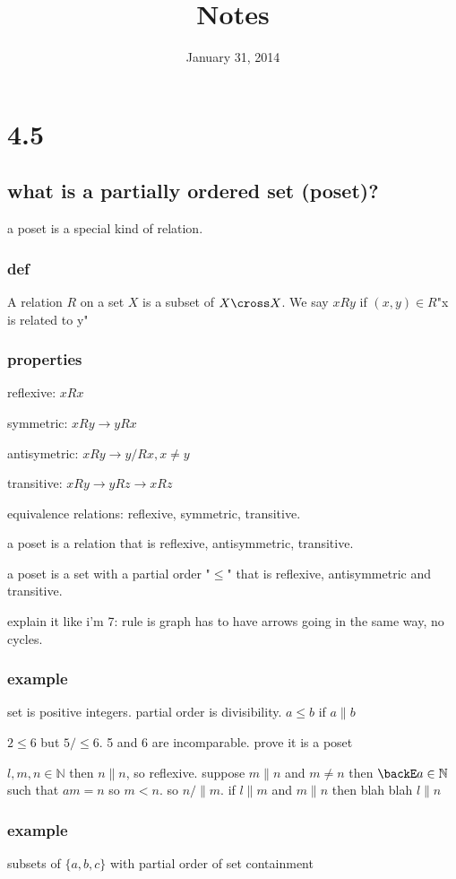 \documentclass{article}
\begin{document}
\title{Notes}
\date{January 31, 2014}
\maketitle
\section*{4.5}
\subsection*{what is a partially ordered set (poset)?}

a poset is a special kind of relation.
\subsubsection*{def}
A relation $R$ on a set $X$ is a subset of $X\cross X$. We say $xRy$ if $(x,y)\in R$"x is related to y"
\subsubsection*{properties}
reflexive: $xRx$

symmetric: $xRy\to yRx$

antisymetric: $xRy\to y\slash{R}x, x\neq y$

transitive: $xRy\to yRz\to xRz$

equivalence relations: reflexive, symmetric, transitive.

a poset is a relation that is reflexive, antisymmetric, transitive.

a poset is a set with a partial order "$\leq$" that is reflexive, antisymmetric and transitive.

explain it like i'm 7: rule is graph has to have arrows going in the same way, no cycles.

\subsubsection*{example}
set is positive integers. partial order is divisibility.
$a\leq b$ if $a\|b$

$2\leq 6$ but $5\slash\leq 6$. 5 and 6 are incomparable. prove it is a poset

$l,m,n\in \mathbb{N}$ then $n\|n$, so reflexive. suppose $m\|n$ and $m\neq n$ then $\backE a\in\mathbb{N}$ such that $am=n$ so $m<n$. so $n\slash \| m$. if $l\|m$ and $m\|n$ then blah blah $l\|n$
\subsubsection*{example}
subsets of $\{a,b,c\}$ with partial order of set containment
\end{document}
